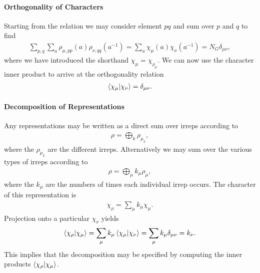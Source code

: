 \paragraph{Orthogonality of Characters}
Starting from the relation we may consider element $pq$ and sum over $p$ and $q$ to find
\begin{align*}
	\sum\limits_{p, q}\sum\limits_{a}\rho_{\mu, pp}(a)\rho_{\nu, qq}(a^{-1}) = \sum\limits_{a}\chi_{\mu}(a)\chi_{\nu}(a^{-1}) = N_{G}\delta_{\mu\nu},
\end{align*}
where we have introduced the shorthand $\chi_{\mu} = \chi_{\rho_{\mu}}$. We can now use the character inner product to arrive at the orthogonality relation
\begin{align*}
	\braket{\chi_{\mu}}{\chi_{\nu}} = \delta_{\mu\nu}.
\end{align*}

\paragraph{Decomposition of Representations}
Any representations may be written as a direct sum over irreps according to
\begin{align*}
	\rho = \bigoplus\limits_{k}\rho_{\mu_{k}},
\end{align*}
where the $\rho_{\mu_{k}}$ are the different irreps. Alternatively we may sum over the various types of irreps according to
\begin{align*}
	\rho = \bigoplus\limits_{\mu}k_{\mu}\rho_{\mu},
\end{align*}
where the $k_{\mu}$ are the numbers of times each individual irrep occurs. The character of this representation is
\begin{align*}
	\chi_{\rho} = \sum\limits_{\mu}k_{\mu}\chi_{\mu}.
\end{align*}
Projection onto a particular $\chi_{\nu}$ yields
\begin{align*}
	\braket{\chi_{\rho}}{\chi_{\mu}} = \sum\limits_{\mu}k_{\mu}\braket{\chi_{\mu}}{\chi_{\nu}} = \sum\limits_{\mu}k_{\mu}\delta_{\mu\nu} = k_{\nu}.
\end{align*}
This implies that the decomposition may be specified by computing the inner products $\braket{\chi_{\rho}}{\chi_{\mu}}$.